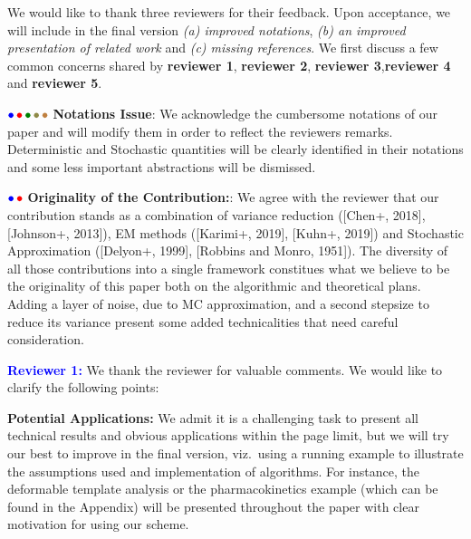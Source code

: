\documentclass{article}
\begin{document}
We would like to thank three reviewers for their feedback. Upon acceptance, we will include in the final version \emph{{\sf (a)} improved notations}, \emph{{\sf (b)} an improved presentation of related work} and \emph{{\sf (c)} missing references}. 
We first discuss a few common concerns shared by \textbf{\color{blue}reviewer 1}, \textbf{\color{red} reviewer 2}, \textbf{\color{green!50!black}reviewer 3},\textbf{\color{yellow!50!black}reviewer 4} and \textbf{\color{brown}reviewer 5}.

${\color{blue}\bullet}\!~{\color{red}\bullet}\!~{\color{green!50!black}\bullet}\!~{\color{yellow!50!black}\bullet}\!~{\color{brown}\bullet}$ \textbf{Notations Issue}: 
We acknowledge the cumbersome notations of our paper and will modify them in order to reflect the reviewers remarks. 
Deterministic and Stochastic quantities will be clearly identified in their notations and some less important abstractions will be dismissed.


${\color{blue}\bullet}\!~{\color{red}\bullet}$ \textbf{Originality of the Contribution:}: We agree with the reviewer that our contribution stands as a combination of variance reduction ([Chen+, 2018], [Johnson+, 2013]), EM methods ([Karimi+, 2019], [Kuhn+, 2019]) and Stochastic Approximation ([Delyon+, 1999], [Robbins and Monro, 1951]). 
The diversity of all those contributions into a single framework constitues what we believe to be the originality of this paper both on the algorithmic and theoretical plans.
Adding a layer of noise, due to MC approximation, and a second stepsize to reduce its variance present some added technicalities that need careful consideration.





\textbf{\textcolor{blue}{Reviewer 1:}} We thank the reviewer for valuable comments. We would like to clarify the following points:

\textbf{Potential Applications:} We admit it is a challenging task to present all technical results and obvious applications within the page limit, but we will try our best to improve in the final version, viz.~using a running example to illustrate the assumptions used and implementation of algorithms. For instance, the deformable template analysis or the pharmacokinetics example (which can be found in the Appendix) will be presented throughout the paper with clear motivation for using our scheme.
\end{document}
